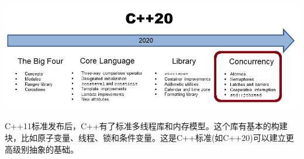 \begin{center}
\includegraphics[width=1.0\textwidth]{content/3/chapter6/images/1.png}\\
\end{center}

C++11标准发布后，C++有了标准多线程库和内存模型。这个库有基本的构建块，比如原子变量、线程、锁和条件变量。这是C++标准(如C++20)可以建立更高级别抽象的基础。